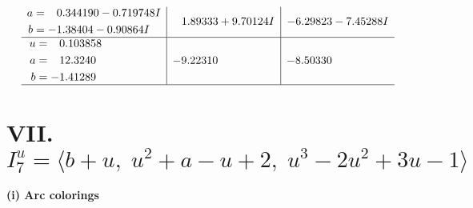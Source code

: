 \documentclass[1p]{elsarticle_modified}
\theoremstyle{definition}
\begin{document}
$$\begin{array}{c|c|c}
\begin{aligned}
a &= \phantom{-}0.344190 - 0.719748 I \\
b &= -1.38404 - 0.90864 I\end{aligned}
 & \phantom{-}1.89333 + 9.70124 I & -6.29823 - 7.45288 I \\ \hline\begin{aligned}
u &= \phantom{-}0.103858\phantom{ +0.000000I} \\
a &= \phantom{-}12.3240\phantom{ +0.000000I} \\
b &= -1.41289\phantom{ +0.000000I}\end{aligned}
 & -9.22310\phantom{ +0.000000I} & -8.50330\phantom{ +0.000000I}\\
 \hline 
 \end{array}$$\newpage\newpage\renewcommand{\arraystretch}{1}
\centering \section*{VII. $I^u_{7}= \langle b+u,\;u^2+a- u+2,\;u^3-2 u^2+3 u-1 \rangle$}
\flushleft \textbf{(i) Arc colorings}\\
\end{document}
